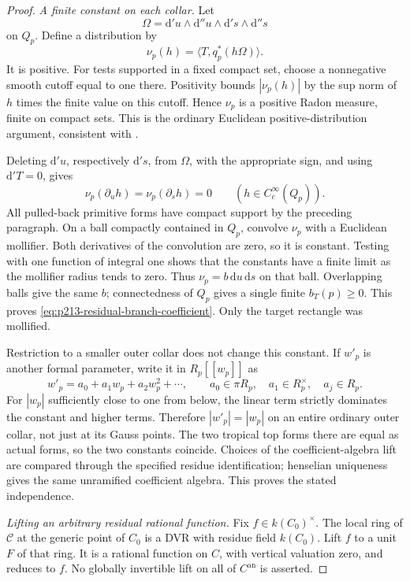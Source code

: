 \begin{proof}
\emph{A finite constant on each collar.}
Let
\[
 \Omega=\mathrm d'u\wedge\mathrm d''u\wedge
          \mathrm d's\wedge\mathrm d''s
\]
on \(Q_p\). Define a distribution by
\[
 \nu_p(h)=\langle T,q_p^*(h\Omega)\rangle.
\]
It is positive. For tests supported in a fixed compact set,
choose a nonnegative smooth cutoff equal to one there.
Positivity bounds \(|\nu_p(h)|\) by the sup norm of \(h\) times
the finite value on this cutoff. Hence \(\nu_p\) is a positive
Radon measure, finite on compact sets. This is the ordinary
Euclidean positive-distribution argument, consistent with
\cite[Sections 7.2.6 and 7.2.8--7.2.9, pp.~161--162]{CLD25}.

Deleting \(\mathrm d'u\), respectively \(\mathrm d's\), from
\(\Omega\), with the appropriate sign, and using
\(\mathrm d'T=0\), gives
\[
 \nu_p(\partial_u h)=\nu_p(\partial_s h)=0
 \qquad(h\in C_c^\infty(Q_p)).
\]
All pulled-back primitive forms have compact support by the
preceding paragraph. On a ball compactly contained in \(Q_p\),
convolve \(\nu_p\) with a Euclidean mollifier. Both derivatives
of the convolution are zero, so it is constant. Testing with
one function of integral one shows that the constants have a
finite limit as the mollifier radius tends to zero. Thus
\(\nu_p=b\,\mathrm du\,\mathrm ds\) on that ball. Overlapping
balls give the same \(b\); connectedness of \(Q_p\) gives a
single finite \(b_T(p)\geq0\). This proves
\eqref{eq:p213-residual-branch-coefficient}. Only the target
rectangle was mollified.

Restriction to a smaller outer collar does not change this
constant. If \(w'_p\) is another formal parameter, write it in
\(R_p[[w_p]]\) as
\[
 w'_p=a_0+a_1w_p+a_2w_p^2+\cdots,\qquad
 a_0\in\pi R_p,\quad a_1\in R_p^\times,\quad a_j\in R_p.
\]
For \(|w_p|\) sufficiently close to one from below, the linear
term strictly dominates the constant and higher terms.
Therefore \(|w'_p|=|w_p|\) on an entire ordinary outer collar,
not just at its Gauss points. The two tropical top forms there
are equal as actual forms, so the two constants coincide.
Choices of the coefficient-algebra lift are compared through the
specified residue identification; henselian uniqueness gives the
same unramified coefficient algebra. This proves the stated
independence.

\emph{Lifting an arbitrary residual rational function.}
Fix \(f\in k(C_0)^\times\). The local ring of \(\mathcal C\) at
the generic point of \(C_0\) is a DVR with residue field
\(k(C_0)\). Lift \(f\) to a unit \(F\) of that ring. It is a
rational function on \(C\), with vertical valuation zero, and
reduces to \(f\). No globally invertible lift on all of
\(C^{\mathrm{an}}\) is asserted.


\end{proof}
